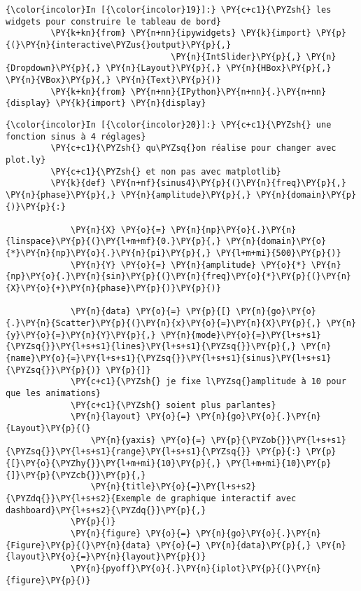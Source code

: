     \begin{Verbatim}[commandchars=\\\{\},frame=single,framerule=0.3mm,rulecolor=\color{cellframecolor}]
{\color{incolor}In [{\color{incolor}19}]:} \PY{c+c1}{\PYZsh{} les widgets pour construire le tableau de bord}
         \PY{k+kn}{from} \PY{n+nn}{ipywidgets} \PY{k}{import} \PY{p}{(}\PY{n}{interactive\PYZus{}output}\PY{p}{,}
                                 \PY{n}{IntSlider}\PY{p}{,} \PY{n}{Dropdown}\PY{p}{,} \PY{n}{Layout}\PY{p}{,} \PY{n}{HBox}\PY{p}{,} \PY{n}{VBox}\PY{p}{,} \PY{n}{Text}\PY{p}{)}
         \PY{k+kn}{from} \PY{n+nn}{IPython}\PY{n+nn}{.}\PY{n+nn}{display} \PY{k}{import} \PY{n}{display}
\end{Verbatim}


    \begin{Verbatim}[commandchars=\\\{\},frame=single,framerule=0.3mm,rulecolor=\color{cellframecolor}]
{\color{incolor}In [{\color{incolor}20}]:} \PY{c+c1}{\PYZsh{} une fonction sinus à 4 réglages}
         \PY{c+c1}{\PYZsh{} qu\PYZsq{}on réalise pour changer avec plot.ly}
         \PY{c+c1}{\PYZsh{} et non pas avec matplotlib}
         \PY{k}{def} \PY{n+nf}{sinus4}\PY{p}{(}\PY{n}{freq}\PY{p}{,} \PY{n}{phase}\PY{p}{,} \PY{n}{amplitude}\PY{p}{,} \PY{n}{domain}\PY{p}{)}\PY{p}{:}
         
             \PY{n}{X} \PY{o}{=} \PY{n}{np}\PY{o}{.}\PY{n}{linspace}\PY{p}{(}\PY{l+m+mf}{0.}\PY{p}{,} \PY{n}{domain}\PY{o}{*}\PY{n}{np}\PY{o}{.}\PY{n}{pi}\PY{p}{,} \PY{l+m+mi}{500}\PY{p}{)}
             \PY{n}{Y} \PY{o}{=} \PY{n}{amplitude} \PY{o}{*} \PY{n}{np}\PY{o}{.}\PY{n}{sin}\PY{p}{(}\PY{n}{freq}\PY{o}{*}\PY{p}{(}\PY{n}{X}\PY{o}{+}\PY{n}{phase}\PY{p}{)}\PY{p}{)}
         
             \PY{n}{data} \PY{o}{=} \PY{p}{[} \PY{n}{go}\PY{o}{.}\PY{n}{Scatter}\PY{p}{(}\PY{n}{x}\PY{o}{=}\PY{n}{X}\PY{p}{,} \PY{n}{y}\PY{o}{=}\PY{n}{Y}\PY{p}{,} \PY{n}{mode}\PY{o}{=}\PY{l+s+s1}{\PYZsq{}}\PY{l+s+s1}{lines}\PY{l+s+s1}{\PYZsq{}}\PY{p}{,} \PY{n}{name}\PY{o}{=}\PY{l+s+s1}{\PYZsq{}}\PY{l+s+s1}{sinus}\PY{l+s+s1}{\PYZsq{}}\PY{p}{)} \PY{p}{]}
             \PY{c+c1}{\PYZsh{} je fixe l\PYZsq{}amplitude à 10 pour que les animations}
             \PY{c+c1}{\PYZsh{} soient plus parlantes}
             \PY{n}{layout} \PY{o}{=} \PY{n}{go}\PY{o}{.}\PY{n}{Layout}\PY{p}{(}
                 \PY{n}{yaxis} \PY{o}{=} \PY{p}{\PYZob{}}\PY{l+s+s1}{\PYZsq{}}\PY{l+s+s1}{range}\PY{l+s+s1}{\PYZsq{}} \PY{p}{:} \PY{p}{[}\PY{o}{\PYZhy{}}\PY{l+m+mi}{10}\PY{p}{,} \PY{l+m+mi}{10}\PY{p}{]}\PY{p}{\PYZcb{}}\PY{p}{,}
                 \PY{n}{title}\PY{o}{=}\PY{l+s+s2}{\PYZdq{}}\PY{l+s+s2}{Exemple de graphique interactif avec dashboard}\PY{l+s+s2}{\PYZdq{}}\PY{p}{,}
             \PY{p}{)}
             \PY{n}{figure} \PY{o}{=} \PY{n}{go}\PY{o}{.}\PY{n}{Figure}\PY{p}{(}\PY{n}{data} \PY{o}{=} \PY{n}{data}\PY{p}{,} \PY{n}{layout}\PY{o}{=}\PY{n}{layout}\PY{p}{)}
             \PY{n}{pyoff}\PY{o}{.}\PY{n}{iplot}\PY{p}{(}\PY{n}{figure}\PY{p}{)}
\end{Verbatim}



